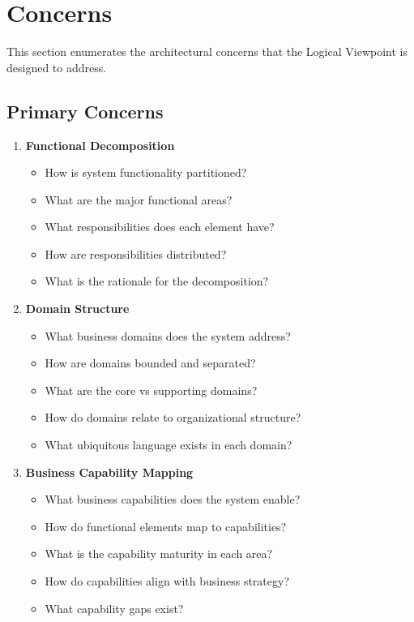 \documentclass[11pt,letterpaper]{article}
\begin{document}
\section{Concerns}

This section enumerates the architectural concerns that the Logical Viewpoint is designed to address.

\subsection{Primary Concerns}

\begin{enumerate}[label=\textbf{C\arabic*:}, leftmargin=2.5em]
    \item \textbf{Functional Decomposition}
    \begin{itemize}[nosep]
        \item How is system functionality partitioned?
        \item What are the major functional areas?
        \item What responsibilities does each element have?
        \item How are responsibilities distributed?
        \item What is the rationale for the decomposition?
    \end{itemize}
    
    \item \textbf{Domain Structure}
    \begin{itemize}[nosep]
        \item What business domains does the system address?
        \item How are domains bounded and separated?
        \item What are the core vs supporting domains?
        \item How do domains relate to organizational structure?
        \item What ubiquitous language exists in each domain?
    \end{itemize}
    
    \item \textbf{Business Capability Mapping}
    \begin{itemize}[nosep]
        \item What business capabilities does the system enable?
        \item How do functional elements map to capabilities?
        \item What is the capability maturity in each area?
        \item How do capabilities align with business strategy?
        \item What capability gaps exist?
    \end{itemize}
    

\end{enumerate}
\end{document}
